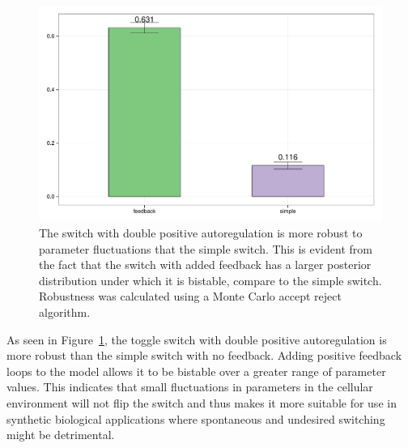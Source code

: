 \begin{figure}[p]
\centering
\includegraphics[scale=0.5]{chapterModelling/images/robustness_comparison.pdf}
\caption[The robustness of the double positive and the simple switch mass action models]{The switch with double positive autoregulation is more robust to parameter fluctuations that the simple switch. This is evident from the fact that the switch with added feedback has a larger posterior distribution under which it is bistable, compare to the simple switch. Robustness was calculated using a Monte Carlo accept reject algorithm. }
\label{fig:robust_std_doubpos}
\end{figure}
As seen in Figure~\ref{fig:robust_std_doubpos}, the toggle switch with double positive autoregulation is more robust than the simple switch with no feedback. Adding positive feedback loops to the model allows it to be bistable over a greater range of parameter values. This indicates that small fluctuations in parameters in the cellular environment will not flip the switch and thus makes it more suitable for use in synthetic biological applications where spontaneous and undesired switching might be detrimental. 


